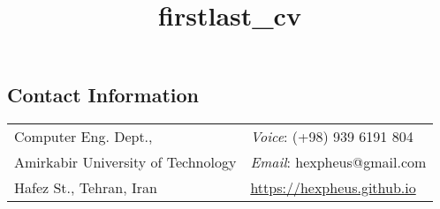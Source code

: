 \documentclass[margin,line,pifont,palatino,courier]{res}
\begin{document}
\title{firstlast_cv}
\begin{resume}

\section{\sc Contact Information}

\vspace{.05in}
\begin{tabular}{@{}p{3in}p{2in}}
Computer Eng. Dept.,         & \textit{Voice}: (+98) 939 6191 804 \\
Amirkabir University of Technology   & \textit{Email}: hexpheus@gmail.com \\
Hafez St., Tehran, Iran                 & \url{https://hexpheus.github.io}\\
\end{tabular}














\end{resume}
\end{document}
